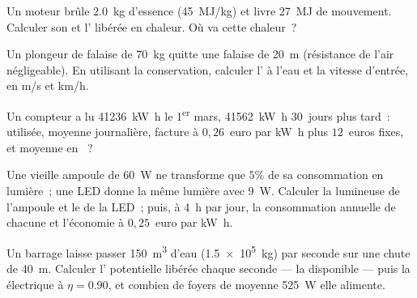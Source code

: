 \begin{exercise}[$\star\star$]\label{exo:g10:energy-conservation:6}
Un moteur brûle \qty{2.0}{kg} d'essence (\qty{45}{MJ/kg}) et livre
\qty{27}{MJ} de mouvement. Calculer son
 et l'
libérée en chaleur. Où va cette chaleur~?
\end{exercise}

\begin{exercise}[$\star\star$]\label{exo:g10:energy-conservation:7}
Un plongeur de falaise de \qty{70}{kg} quitte une falaise de
\qty{20}{m} (résistance de l'air négligeable). En utilisant la
conservation, calculer l' à l'eau
et la vitesse d'entrée, en \unit{m/s} et \unit{km/h}.
\end{exercise}

\begin{exercise}[$\star\star$]\label{exo:g10:energy-conservation:8}
Un compteur a lu \qty{41236}{kW.h} le 1\textsuperscript{er} mars,
\qty{41562}{kW.h} $30$~jours plus tard~:
 utilisée, moyenne journalière, facture à
$0{,}26$~euro par \unit{kW.h} plus $12$~euros fixes, et
 moyenne en ~?
\end{exercise}

\begin{exercise}[$\star\star$]\label{exo:g10:energy-conservation:9}
Une vieille ampoule de \qty{60}{W} ne transforme que $5\%$ de sa
consommation en lumière~; une LED donne la même lumière avec
\qty{9}{W}. Calculer la  lumineuse de
l'ampoule et le  de la LED~; puis, à
\qty{4}{h} par jour, la consommation annuelle de chacune et l'économie
à $0{,}25$~euro par \unit{kW.h}.
\end{exercise}

\begin{exercise}[$\star\star$]\label{exo:g10:energy-conservation:10}
Un barrage laisse passer \qty{150}{m^3} d'eau (\qty{1.5e5}{kg}) par
seconde sur une chute de \qty{40}{m}. Calculer l'
potentielle libérée chaque seconde --- la
 disponible --- puis la
 électrique à $\eta = 0.90$, et combien de
foyers de moyenne \qty{525}{W} elle alimente.
\end{exercise}

